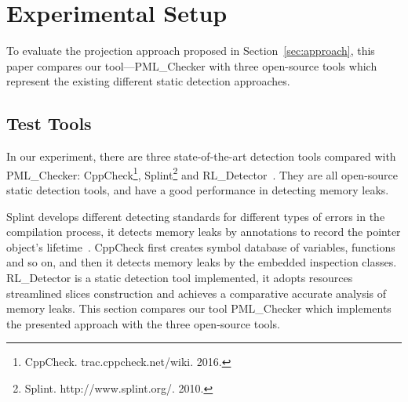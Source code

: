 \section{Experimental Setup}\label{sec:setup}
To evaluate the projection approach proposed in Section~\ref{sec:approach}, 
this paper compares our tool---PML\_Checker with three open-source tools which represent the existing different static detection approaches. 
\subsection{Test Tools}\label{ssec:tool}
In our experiment, there are three state-of-the-art detection tools compared with PML\_Checker: CppCheck\footnote{CppCheck. trac.cppcheck.net/wiki. 2016.}, Splint\footnote{Splint. http://www.splint.org/. 2010.} and RL\_Detector~\cite{J14}. They are all open-source static detection tools, and have a good performance in detecting memory leaks.

Splint develops different detecting standards for different types of errors in the compilation process, it detects memory leaks by annotations to record the pointer object’s lifetime~\cite{EL02}. CppCheck first creates symbol database of variables, functions and so on, and then it detects memory leaks by the embedded inspection classes. RL\_Detector is a static detection tool implemented, it adopts resources streamlined slices construction and achieves a comparative accurate analysis of memory leaks. This section compares our tool PML\_Checker which implements the presented approach with the three open-source tools.
